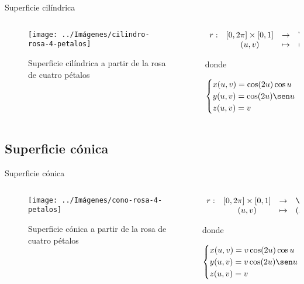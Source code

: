 \documentclass[10pt]{beamer}
\begin{document}
	\begin{frame}{Superficie cilíndrica}
		
		\begin{columns}[t] %
			\begin{column}{.50\textwidth}
				\begin{figure}
					\centering
					\texttt{[image: ../Imágenes/cilindro-rosa-4-petalos]}
					\caption{Superficie cilíndrica a partir de la rosa de cuatro pétalos}
					\label{fig:cilindro-rosa-4-petalos}
				\end{figure}
			\end{column}%
			\hfill%
			\begin{column}{.50\textwidth}
				$$\begin{array}{rcll}
				r : & [0, 2\pi] \times [0,1] & \to & \R^3\\
				& (u,v) & \mapsto & (x,y,z)
				\end{array}$$
				
				donde 
				
				$$ \begin{cases}
				x(u,v) = \cos(2u)\cos u \\
				y(u,v) = \cos(2u) \sen u \\
				z(u,v) = v
				\end{cases} $$
			\end{column}%
		\end{columns}
		
	\end{frame}
	
	\subsection{Superficie cónica}
	
	\begin{frame}{Superficie cónica}
		\begin{columns}[t] %
			\begin{column}{.50\textwidth}
				\begin{figure}
					\centering
					\texttt{[image: ../Imágenes/cono-rosa-4-petalos]}
					\caption{Superficie cónica a partir de la rosa de cuatro pétalos}
					\label{fig:cono-rosa-4-petalos}
				\end{figure}
			\end{column}%
			\hfill%
			\begin{column}{.50\textwidth}
				$$\begin{array}{rcll}
				r : & [0, 2\pi] \times [0,1] & \to & \R^3\\
				& (u,v) & \mapsto & (x,y,z)
				\end{array}$$
				
				donde 
				
				$$ \begin{cases}
				x(u,v) = v\cos(2u)\cos u \\
				y(u,v) = v\cos(2u) \sen u \\
				z(u,v) = v
				\end{cases} $$
			\end{column}%
		\end{columns}
	\end{frame}
	
\end{document}

